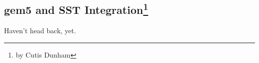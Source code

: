 \subsection[gem5 and SST Integration]{gem5 and SST Integration\footnote{by Cutis Dunham}}
\label{sec:sst}

Haven't head back, yet.
